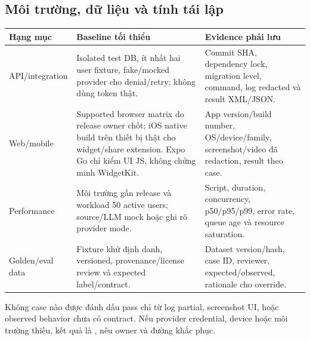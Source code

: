 \documentclass[12pt,a4paper]{article}
\begin{document}
\subsection{Môi trường, dữ liệu và tính tái lập}
\begin{longtable}{p{3.1cm}p{4.2cm}p{6cm}}
\toprule Hạng mục & Baseline tối thiểu & Evidence phải lưu \\ \midrule\endhead
API/integration & Isolated test DB, ít nhất hai user fixture, fake/mocked provider cho denial/retry; không dùng token thật. & Commit SHA, dependency lock, migration level, command, log redacted và result XML/JSON. \\
Web/mobile & Supported browser matrix do release owner chốt; iOS native build trên thiết bị thật cho widget/share extension. Expo Go chỉ kiểm UI JS, không chứng minh WidgetKit. & App version/build number, OS/device/family, screenshot/video đã redaction, result theo case. \\
Performance & Môi trường gần release và workload 50 active users; source/LLM mock hoặc ghi rõ provider mode. & Script, duration, concurrency, p50/p95/p99, error rate, queue age và resource saturation. \\
Golden/eval data & Fixture khử định danh, versioned, provenance/license review và expected label/contract. & Dataset version/hash, case ID, reviewer, expected/observed, rationale cho override. \\
\bottomrule
\end{longtable}

Không case nào được đánh dấu pass chỉ từ log partial, screenshot UI, hoặc observed behavior chưa có contract. Nếu provider credential, device hoặc môi trường thiếu, kết quả là , nêu owner và đường khắc phục.
\end{document}
